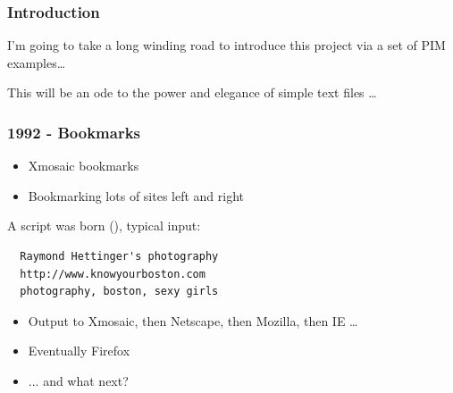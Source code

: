 \documentclass[compress,trans]{beamer}
\begin{document}
% 

\begin{frame}[fragile]
  \frametitle{Introduction}

  I'm going to take a long winding road to introduce this project via a set of
  PIM examples\dots

\vfill\pause

  This will be an ode to the power and elegance of simple text files \dots


\end{frame}




\begin{frame}[fragile]
  \frametitle{1992 - Bookmarks}

  \begin{itemize}
    \item Xmosaic bookmarks
    \item Bookmarking lots of sites left and right
  \end{itemize}

\pause
A script was born (\verb@bmmgr@), typical input:


\begin{verbatim}
  Raymond Hettinger's photography
  http://www.knowyourboston.com
  photography, boston, sexy girls
\end{verbatim}

  \begin{itemize}
    \item Output to Xmosaic, then Netscape, then Mozilla, then IE \dots
    \item Eventually Firefox
    \item ... and what next?
  \end{itemize}


\end{frame}
\end{document}
